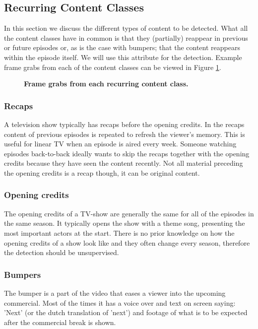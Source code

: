 \documentclass{article}
\begin{document}
\subsection{Recurring Content Classes} \label{section:segmentclasses}
In this section we discuss the different types of content to be detected. What all the content classes have in common is that they (partially) reappear in previous or future episodes or, as is the case with bumpers; that the content reappears within the episode itself. We will use this attribute for the detection. Example frame grabs from each of the content classes can be viewed in Figure \ref{fig:introductionexamples}.

\begin{figure}[h]
	\caption{\textbf{Frame grabs from each recurring content class.}}
	\label{fig:introductionexamples}
\end{figure}

\subsubsection{Recaps}
A television show typically has recaps before the opening credits. In the recaps content of previous episodes is repeated to refresh the viewer's memory. This is useful for linear TV when an episode is aired every week. Someone watching episodes back-to-back ideally wants to skip the recaps together with the opening credits because they have seen the content recently. Not all material preceding the opening credits is a recap though, it can be original content.

\subsubsection{Opening credits}
The opening credits of a TV-show are generally the same for all of the episodes in the same season. It typically opens the show with a theme song, presenting the most important actors at the start. There is no prior knowledge on how the opening credits of a show look like and they often change every season, therefore the detection should be unsupervised.

\subsubsection{Bumpers}
The bumper is a part of the video that eases a viewer into the upcoming commercial. Most of the times it has a voice over and text on screen saying: 'Next' (or the dutch translation of 'next') and footage of what is to be expected after the commercial break is shown.
\end{document}
